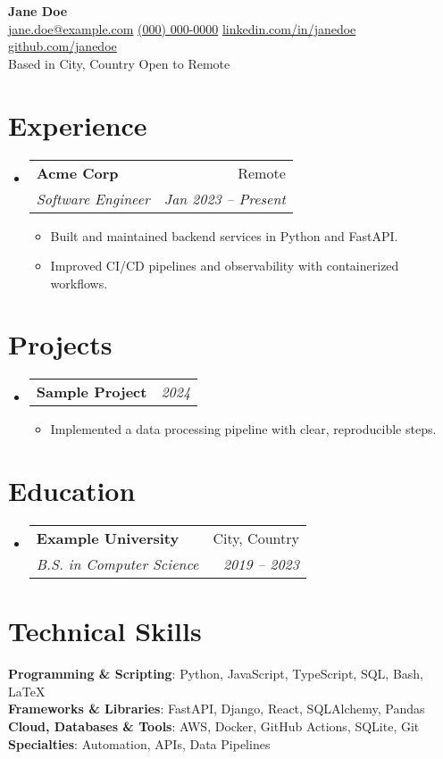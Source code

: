 \documentclass[letterpaper,11pt]{article}
\makeatletter
\newcommand{\resumeItem}[1]{\item\small{{#1 \vspace{-2pt}}}}
\newcommand{\resumeSubheading}[4]{\vspace{-2pt}\item
  \begin{tabular*}{0.97\textwidth}[t]{l@{\extracolsep{\fill}}r}
    \textbf{#1} & #2 \\
    \textit{\small#3} & \textit{\small #4} \\
  \end{tabular*}\vspace{-12pt}}
\newcommand{\resumeProjectHeading}[2]{\item
  \begin{tabular*}{0.97\textwidth}{l@{\extracolsep{\fill}}r}
    \small#1 & #2 \\
  \end{tabular*}\vspace{-7pt}}
\newcommand{\resumeSubHeadingListStart}{\begin{itemize}[leftmargin=0.15in, label={}]}
\newcommand{\resumeSubHeadingListEnd}{\end{itemize}}
\makeatother
\begin{document}
\begin{center}
  {\LARGE\textbf{Jane Doe}} \\
  \href{mailto:jane.doe@example.com}{jane.doe@example.com} \textbullet
  \href{tel:+10000000000}{(000) 000-0000} \textbullet
  \href{https://linkedin.com/in/janedoe}{linkedin.com/in/janedoe} \textbullet
  \href{https://github.com/janedoe}{github.com/janedoe} \\
  \small Based in City, Country \quad \textbullet \quad Open to Remote
\end{center}

\section{Experience}
\resumeSubHeadingListStart
  \resumeSubheading{Acme Corp}{Remote}{Software Engineer}{Jan 2023 -- Present}
  \begin{itemize}
    \resumeItem{Built and maintained backend services in Python and FastAPI.}
    \resumeItem{Improved CI/CD pipelines and observability with containerized workflows.}
  \end{itemize}
\resumeSubHeadingListEnd

\section{Projects}
\resumeSubHeadingListStart
  \resumeProjectHeading{\textbf{Sample Project}}{\textit{2024}}
  \begin{itemize}
    \resumeItem{Implemented a data processing pipeline with clear, reproducible steps.}
  \end{itemize}
\resumeSubHeadingListEnd

\section{Education}
\resumeSubHeadingListStart
  \resumeSubheading{Example University}{City, Country}{B.S. in Computer Science}{2019 -- 2023}
\resumeSubHeadingListEnd

\section{Technical Skills}
\begin{itemize}[leftmargin=0.15in, label={}]
  \small{\item{
    \textbf{Programming \& Scripting}{: Python, JavaScript, TypeScript, SQL, Bash, LaTeX} \\
    \textbf{Frameworks \& Libraries}{: FastAPI, Django, React, SQLAlchemy, Pandas} \\
    \textbf{Cloud, Databases \& Tools}{: AWS, Docker, GitHub Actions, SQLite, Git} \\
    \textbf{Specialties}{: Automation, APIs, Data Pipelines}
  }}
\end{itemize}
\end{document}
